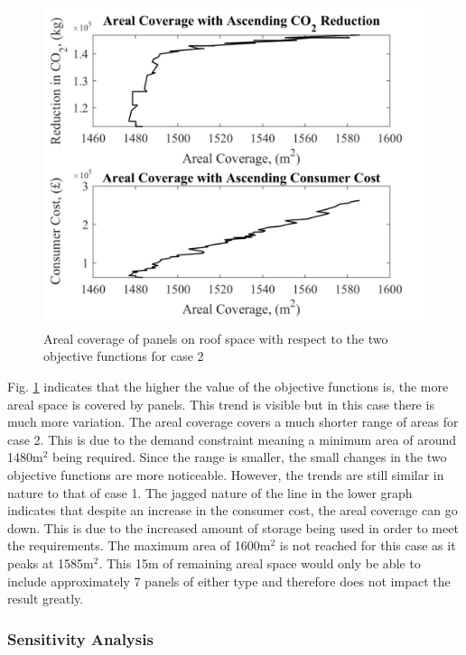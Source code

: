 \begin{figure}[H]
	\centering
    \includegraphics[width=\columnwidth]{Figures/ArealCoverage2.jpg}
    \caption{Areal coverage of panels on roof space with respect to the two objective functions for case 2}
    \label{fig:ArealCoverage2}
\end{figure}

Fig. \ref{fig:ArealCoverage2} indicates that the higher the value of the objective functions is, the more areal space is covered by panels. This trend is visible but in this case there is much more variation. The areal coverage covers a much shorter range of areas for case 2. This is due to the demand constraint meaning a minimum area of around 1480m$^2$ being required. Since the range is smaller, the small changes in the two objective functions are more noticeable. However, the trends are still similar in nature to that of case 1. The jagged nature of the line in the lower graph indicates that despite an increase in the consumer cost, the areal coverage can go down. This is due to the increased amount of storage being used in order to meet the requirements. The maximum area of 1600m$^2$ is not reached for this case as it peaks at 1585m$^2$. This 15m of remaining areal space would only be able to include approximately 7 panels of either type and therefore does not impact the result greatly.
  
\subsubsection{Sensitivity Analysis}

